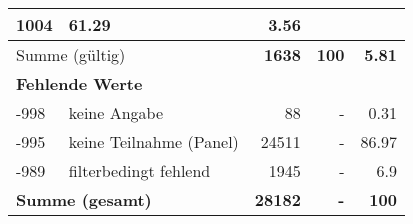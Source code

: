 \begin{longtable}{lXrrr}
       \num{1004} &
       \num[round-mode=places,round-precision=2]{61,29} &
         \num[round-mode=places,round-precision=2]{3,56} \\
     \midrule
     \multicolumn{2}{l}{Summe (gültig)} &
       \textbf{\num{1638}} &
     \textbf{100} &
       \textbf{\num[round-mode=places,round-precision=2]{5,81}} \\
     \multicolumn{5}{l}{\textbf{Fehlende Werte}}\\
       -998 &
       keine Angabe &
         \num{88} &
        - &
         \num[round-mode=places,round-precision=2]{0,31} \\
       -995 &
       keine Teilnahme (Panel) &
         \num{24511} &
        - &
         \num[round-mode=places,round-precision=2]{86,97} \\
       -989 &
       filterbedingt fehlend &
         \num{1945} &
        - &
         \num[round-mode=places,round-precision=2]{6,9} \\
     \midrule
     \multicolumn{2}{l}{\textbf{Summe (gesamt)}} &
          \textbf{\num{28182}} &
        \textbf{-} &
        \textbf{100} \\
     \bottomrule
     \end{longtable}
     

